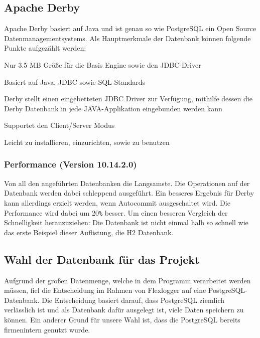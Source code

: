  
\subsection{Apache Derby}

Apache Derby basiert auf Java und ist genau so wie PostgreSQL ein Open Source Datenmanagementsystems. Als Hauptmerkmale der Datenbank können folgende Punkte aufgezählt werden: 

\begin{compactitem}
    \item Nur 3.5 MB Größe für die Basis Engine sowie den JDBC-Driver        
    \item Basiert auf Java, JDBC sowie SQL Standards
    \item Derby stellt einen eingebetteten JDBC Driver zur Verfügung, mithilfe dessen die Derby Datenbank in jede JAVA-Applikation eingebunden werden kann
    \item Supportet den Client/Server Modus
    \item Leicht zu installieren, einzurichten, sowie zu benutzen
\end{compactitem}
\cite{ApacheDerbyOfficialSite}
 

\subsubsection{Performance (Version 10.14.2.0)}
Von all den angeführten Datenbanken die Langsamste. Die Operationen auf der Datenbank werden dabei schleppend ausgeführt. Ein besseres Ergebnis für Derby kann allerdings erzielt werden, wenn Autocommit ausgeschaltet wird. Die Performance wird dabei um 20\texttt{\%} besser. Um einen besseren Vergleich der Schnelligkeit heranzuziehen: Die Datenbank ist nicht einmal halb so schnell wie das erste Beispiel dieser Auflistung, die H2 Datenbank. \cite{databaseComparison}

\subsection{Wahl der Datenbank für das Projekt}
Aufgrund der großen Datenmenge, welche in dem Programm verarbeitet werden müssen, fiel die Entscheidung im Rahmen von Flexlogger auf eine PostgreSQL-Datenbank. Die Entscheidung basiert darauf, dass PostgreSQL ziemlich verlässlich ist und als Datenbank dafür ausgelegt ist, viele Daten speichern zu können. Ein anderer Grund für unsere Wahl ist, dass die PostgreSQL bereits firmenintern genutzt wurde.